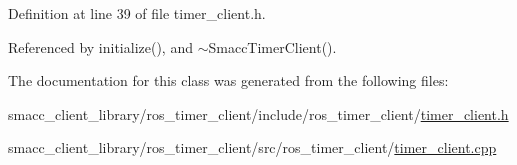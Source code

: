 Definition at line 39 of file timer\+\_\+client.\+h.



Referenced by initialize(), and $\sim$\+Smacc\+Timer\+Client().



The documentation for this class was generated from the following files\+:\begin{DoxyCompactItemize}
\item 
smacc\+\_\+client\+\_\+library/ros\+\_\+timer\+\_\+client/include/ros\+\_\+timer\+\_\+client/\hyperlink{timer__client_8h}{timer\+\_\+client.\+h}\item 
smacc\+\_\+client\+\_\+library/ros\+\_\+timer\+\_\+client/src/ros\+\_\+timer\+\_\+client/\hyperlink{timer__client_8cpp}{timer\+\_\+client.\+cpp}\end{DoxyCompactItemize}
